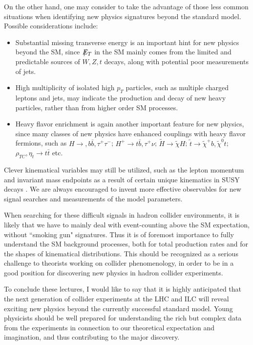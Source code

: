 \documentclass[prd,aps,floats,preprintnumbers,preprint,superscriptaddress,floatfix,nofootinbib]{revtex4}
\newcommand{ \slashchar }[1]{\setbox0=\hbox{$#1$}   %
   \dimen0=\wd0                                     %
   \setbox1=\hbox{/} \dimen1=\wd1                   %
   \ifdim\dimen0>\dimen1                            %
      \rlap{\hbox to \dimen0{\hfil/\hfil}}          %
      #1                                            %
   \else                                            %
      \rlap{\hbox to \dimen1{\hfil$#1$\hfil}}       %
      /                                             %
   \fi}                                             %
\def\etmiss{\slashchar{E}_{T}}
\def\pt{p_T^{}}
\begin{document}
On the other hand, one  may consider to take the advantage 
of those less common situations when identifying new physics signatures 
beyond the standard model. Possible considerations include:
\begin{itemize}
\item Substantial missing transverse energy is an important hint for new
physics beyond the SM, since $\etmiss$ in the SM  mainly comes from the
limited and predictable sources of $W,Z,t$ decays, 
along with potential poor measurements of jets.
%
\item High multiplicity of isolated high $\pt$ particles, such as multiple 
charged leptons and jets, may indicate the production and decay of
new heavy particles, rather than from higher order SM processes.
\item Heavy flavor enrichment is again another important feature
for new physics, since many  classes of new physics have enhanced
couplings with heavy flavor fermions, such as $H\to, b\bar b, \tau^+\tau^-$; 
$H^+ \to t\bar b, \tau^+\nu$; $\tilde H \to \tilde\chi H$;  
$\tilde t \to \tilde\chi^+ b, \tilde\chi^0 t$;
$\rho^{}_{TC}, \eta_{t}^{} \to t\bar t$ etc.
\end{itemize}
Clever kinematical variables may still be utilized, such as the lepton momentum
and invariant mass endpoints as a result of certain unique kinematics in SUSY
decays \cite{endpoint}.  
We are always encouraged to invent more effective  observables for new
signal searches and measurements of the model parameters. 

When searching for these difficult signals
in hadron collider environments, it is likely that we have
to mainly deal with event-counting above the SM expectation, without
``smoking gun" signatures. Thus it is of
foremost importance to fully understand the SM background 
processes, both for total 
production rates and for the shapes of kinematical distributions. 
This should be recognized as a serious challenge to theorists working
on collider phenomenology, in order to be in a good position for discovering 
new physics in hadron collider experiments.

To conclude these lectures, I would like to say  that it is highly anticipated
that the next generation of collider experiments at the LHC and ILC will
reveal exciting new physics beyond the currently successful standard
model. Young physicists should be well prepared for understanding the
rich but complex data from the experiments in connection to our 
theoretical expectation and imagination,  and thus contributing to the
major discovery. 
 
\end{document}
